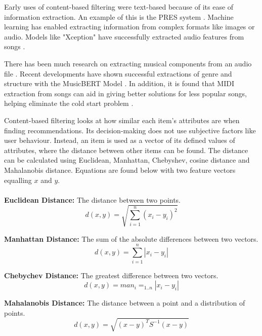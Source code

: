 Early uses of content-based filtering were text-based because of its ease of information extraction. An example of this is the PRES system \citep{van_meteren_using_2000}. Machine learning has enabled extracting information from complex formats like images or audio. Models like "Xception" have successfully extracted audio features from songs \citep{chollet_xception_2017, singh_robustness_2022}.

There has been much research on extracting musical components from an audio file \citep{ribecky_multi-input_2021, zhao_musical_2022}. Recent developments have shown successful extractions of genre and structure with the MusicBERT Model \citep{zhu_musicbert_2021}. In addition, it is found that MIDI extraction from songs can aid in giving better solutions for less popular songs, helping eliminate the cold start problem \citep{yadav_improved_2022}.

Content-based filtering looks at how similar each item's attributes are when finding recommendations. Its decision-making does not use subjective factors like user behaviour. Instead, an item is used as a vector of its defined values of attributes, where the distance between other items can be found. The distance can be calculated using Euclidean, Manhattan, Chebyshev, cosine distance and Mahalanobis distance. Equations are found below with two feature vectors equalling $x$ and $y$.
\\
\\
\textbf{Euclidean Distance:} The distance between two points.
\begin{equation}
	d(x,y) = \sqrt{\sum _{i=1} ^{n}(x_{i} - y_{i})^{2}}
\end{equation}

\textbf{Manhattan Distance:} The sum of the absolute differences between two vectors.
\begin{equation}
	d(x,y) = \sum _{i=1} ^{n} | x_{i} - y_{i} |
\end{equation}

\textbf{Chebychev Distance:} The greatest difference between two vectors.
\begin{equation}
	d(x,y) = man_{i} = _{1 . . n} | x_{i} - y_{i} |
\end{equation}

\textbf{Mahalanobis Distance:} The distance between a point and a distribution of points.
\begin{equation}
	d(x,y) = \sqrt{ ( x - y )^{ T } S^{ -1 } ( x - y ) }
\end{equation}

